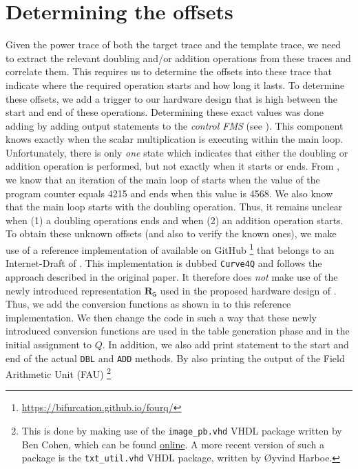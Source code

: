 \section{Determining the offsets} \label{sec: Determining the offsets}
Given the power trace of both the target trace and the template trace, we need to extract the relevant doubling and/or addition operations from these traces and correlate them.
This requires us to determine the offsets into these trace that indicate where the required operation starts and how long it lasts.
To determine these offsets, we add a trigger to our hardware design that is high between the start and end of these operations.
Determining these exact values was done adding by adding output statements to the \emph{control FMS} (see ).
This component knows exactly when the scalar multiplication is executing within the main loop.
Unfortunately, there is only \emph{one} state which indicates that either the doubling or addition operation is performed, but not exactly when it starts or ends.
From \cite{jarvinen2016four}, we know that an iteration of the main loop of {\fourq} starts when the value of the program counter equals 4215 and ends when this value is 4568.
We also know that the main loop starts with the doubling operation.
Thus, it remains unclear when (1) a doubling operations ends and when (2) an addition operation starts.
To obtain these unknown offsets (and also to verify the known ones), we make use of a reference implementation of {\fourq} available on GitHub%
\footnote{\url{https://bifurcation.github.io/fourq/}} that belongs to an Internet-Draft of {\fourq} \cite{ladd-cfrg-4q-01}.
This implementation is dubbed \texttt{Curve4Q} and follows the approach described in the original paper.
It therefore does \emph{not} make use of the newly introduced representation $\bm{R_5}$ used in the proposed hardware design of {\fourq} \cite{jarvinen2016four}.
Thus, we add the conversion functions as shown in  to this reference implementation.
We then change the code in such a way that these newly introduced conversion functions are used in the table generation phase and in the initial assignment to $Q$.
In addition, we also add print statement to the start and end of the actual \texttt{DBL} and \texttt{ADD} methods.
By also printing the output of the Field Arithmetic Unit (FAU)%
\footnote{This is done by making use of the \texttt{image_pb.vhd} VHDL package written by Ben Cohen, which can be found \href{http://web.archive.org/web/20070202003755/http://members.aol.com/vhdlcohen/vhdl/Models.html}{online}.
A more recent version of such a package is the \texttt{txt_util.vhd} VHDL package, written by Øyvind Harboe.}
